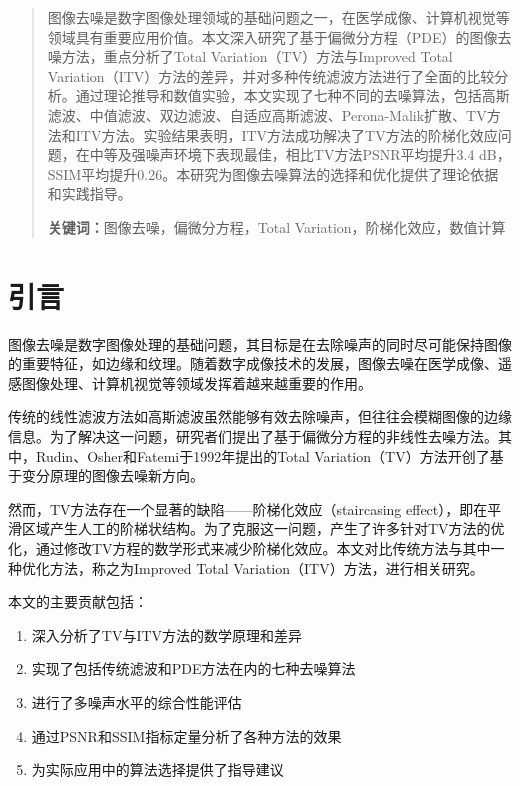 \documentclass[a4paper,12pt]{ctexart}
\begin{document}
\maketitle
\newpage

\begin{abstract}
图像去噪是数字图像处理领域的基础问题之一，在医学成像、计算机视觉等领域具有重要应用价值。本文深入研究了基于偏微分方程（PDE）的图像去噪方法，重点分析了Total Variation（TV）方法与Improved Total Variation（ITV）方法的差异，并对多种传统滤波方法进行了全面的比较分析。通过理论推导和数值实验，本文实现了七种不同的去噪算法，包括高斯滤波、中值滤波、双边滤波、自适应高斯滤波、Perona-Malik扩散、TV方法和ITV方法。实验结果表明，ITV方法成功解决了TV方法的阶梯化效应问题，在中等及强噪声环境下表现最佳，相比TV方法PSNR平均提升3.4 dB，SSIM平均提升0.26。本研究为图像去噪算法的选择和优化提供了理论依据和实践指导。

\textbf{关键词：}图像去噪，偏微分方程，Total Variation，阶梯化效应，数值计算
\end{abstract}

\tableofcontents
\newpage

\section{引言}

图像去噪是数字图像处理的基础问题，其目标是在去除噪声的同时尽可能保持图像的重要特征，如边缘和纹理。随着数字成像技术的发展，图像去噪在医学成像、遥感图像处理、计算机视觉等领域发挥着越来越重要的作用。

传统的线性滤波方法如高斯滤波虽然能够有效去除噪声，但往往会模糊图像的边缘信息。为了解决这一问题，研究者们提出了基于偏微分方程的非线性去噪方法。其中，Rudin、Osher和Fatemi于1992年提出的Total Variation（TV）方法开创了基于变分原理的图像去噪新方向。

然而，TV方法存在一个显著的缺陷——阶梯化效应（staircasing effect），即在平滑区域产生人工的阶梯状结构。为了克服这一问题，产生了许多针对TV方法的优化，通过修改TV方程的数学形式来减少阶梯化效应。本文对比传统方法与其中一种优化方法，称之为Improved Total Variation（ITV）方法，进行相关研究。

本文的主要贡献包括：
\begin{enumerate}
    \item 深入分析了TV与ITV方法的数学原理和差异
    \item 实现了包括传统滤波和PDE方法在内的七种去噪算法
    \item 进行了多噪声水平的综合性能评估
    \item 通过PSNR和SSIM指标定量分析了各种方法的效果
    \item 为实际应用中的算法选择提供了指导建议
\end{enumerate}
\end{document}
